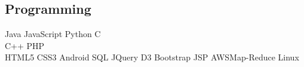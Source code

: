 \documentclass[]{deedy-resume-openfont}
\begin{document}
\begin{minipage}[t]{0.33\textwidth}
\subsection{Programming}
Java \textbullet{}  JavaScript \textbullet{} Python \textbullet{} C \\

C++\textbullet{} PHP \\
HTML5 \textbullet{} CSS3 \textbullet{} Android \textbullet{} SQL\textbullet{} JQuery\textbullet{} D3 \textbullet{} Bootstrap \textbullet{}JSP \textbullet{}AWS\textbullet{}Map-Reduce\textbullet{} Linux
\sectionsep

%
%

\end{minipage} 
\hfill
\end{document}

